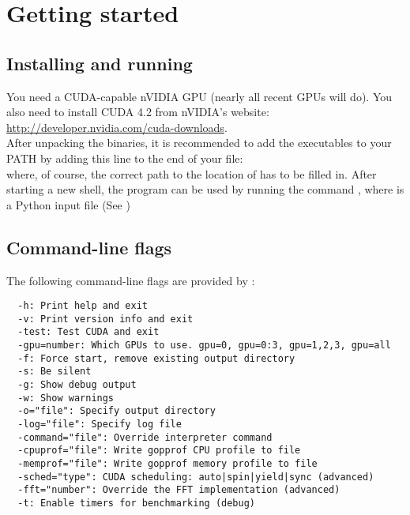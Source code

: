 \section{Getting started}

\subsection{Installing and running \mumax}

You need a CUDA-capable nVIDIA GPU (nearly all recent GPUs will do). You also need to install CUDA 4.2 from nVIDIA's website: \url{http://developer.nvidia.com/cuda-downloads}.\\

After unpacking the \mumax binaries, it is recommended to add the \mumax executables to your PATH by adding this line to the end of your  file:\\
 where, of course, the correct path to the location of \mumax has to be filled in.  After starting a new shell, the program can be used by running the command , where  is a Python input file (See )

\subsection{Command-line flags}

The following command-line flags are provided by \mumax:
\begin{verbatim}
  -h: Print help and exit
  -v: Print version info and exit
  -test: Test CUDA and exit
  -gpu=number: Which GPUs to use. gpu=0, gpu=0:3, gpu=1,2,3, gpu=all
  -f: Force start, remove existing output directory
  -s: Be silent
  -g: Show debug output
  -w: Show warnings
  -o="file": Specify output directory
  -log="file": Specify log file
  -command="file": Override interpreter command
  -cpuprof="file": Write gopprof CPU profile to file
  -memprof="file": Write gopprof memory profile to file
  -sched="type": CUDA scheduling: auto|spin|yield|sync (advanced)
  -fft="number": Override the FFT implementation (advanced)
  -t: Enable timers for benchmarking (debug)
\end{verbatim}


